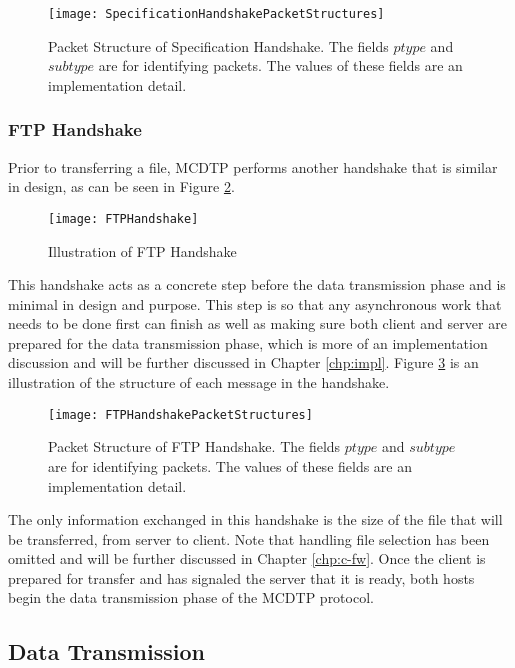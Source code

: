 \begin{figure}[ht]
\centering
\texttt{[image: SpecificationHandshakePacketStructures]}
\caption{Packet Structure of Specification Handshake. The fields $ptype$ and $subtype$ are for identifying packets. The values of these fields are an implementation detail.}
\label{fig:specs-struct}
\end{figure}

\subsubsection{FTP Handshake}\label{subsec:ftp-hs}

Prior to transferring a file, MCDTP performs another handshake that is similar in design, as can be seen in Figure \ref{fig:ftp-hs}.

\begin{figure}[ht]
\centering
\texttt{[image: FTPHandshake]}
\caption{Illustration of FTP Handshake}
\label{fig:ftp-hs}
\end{figure}

This handshake acts as a concrete step before the data transmission phase and is minimal in design and purpose. This step is so that any asynchronous work that needs to be done first can finish as well as making sure both client and server are prepared for the data transmission phase, which is more of an implementation discussion and will be further discussed in Chapter \ref{chp:impl}. Figure \ref{fig:ftp-struct} is an illustration of the structure of each message in the handshake.

\begin{figure}[ht]
\centering
\texttt{[image: FTPHandshakePacketStructures]}
\caption{Packet Structure of FTP Handshake. The fields $ptype$ and $subtype$ are for identifying packets. The values of these fields are an implementation detail.}
\label{fig:ftp-struct}
\end{figure}

 The only information exchanged in this handshake is the size of the file that will be transferred, from server to client. Note that handling file selection has been omitted and will be further discussed in Chapter \ref{chp:c-fw}. Once the client is prepared for transfer and has signaled the server that it is ready, both hosts begin the data transmission phase of the MCDTP protocol.

\subsection{Data Transmission}

